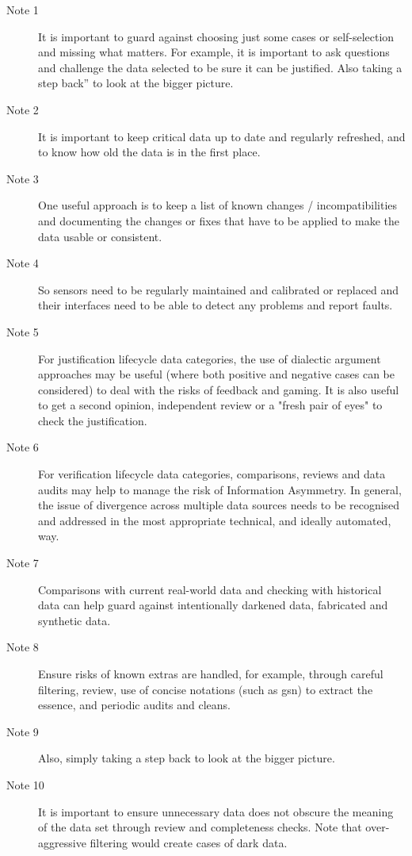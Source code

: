 \begin{description}
\item[Note 1] It is important to guard against choosing just
some cases or self-selection and missing what matters. For example, it is important to ask
questions and challenge the data selected to be sure it can be justified. Also taking a step
back” to look at the bigger picture.
\item[Note 2] It is important to keep critical data up to date and
regularly refreshed, and to know how old the data is in the first place.
\item[Note 3] One useful approach is to keep a list of known changes /
incompatibilities and documenting the changes or fixes that have to be applied to make the
data usable or consistent.
\item[Note 4] So sensors need to be regularly maintained and calibrated or
replaced and their interfaces need to be able to detect any problems and report faults.
\item[Note 5] For justification lifecycle data categories, the use of dialectic
argument approaches may be useful (where both positive and negative cases can be
considered) to deal with the risks of feedback and gaming. It is also useful to get a second
opinion, independent review or a "fresh pair of eyes" to check the justification.
\item[Note 6] For verification lifecycle data categories, comparisons,
reviews and data audits may help to manage the risk of Information Asymmetry. In general,
the issue of divergence across multiple data sources needs to be recognised and addressed in
the most appropriate technical, and ideally automated, way.
\item[Note 7] Comparisons with current real-world data and checking with
historical data can help guard against intentionally darkened data, fabricated and synthetic
data.
\item[Note 8] Ensure risks of known extras are handled, for example,
through careful filtering, review, use of concise notations (such as \gls{gsn})
to extract the essence, and periodic audits and cleans.
\item[Note 9] Also, simply taking a step back to look at the bigger
picture.
\item[Note 10] It is important to ensure unnecessary data does
not obscure the meaning of the data set through review and completeness checks. Note that
over-aggressive filtering would create cases of dark data.
\end{description}
\clearpage%
